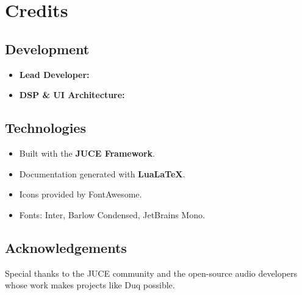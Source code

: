 \chapter{Credits}
\label{ch:credits}

\section{Development}
\begin{itemize}
    \item \textbf{Lead Developer:} \authorname
    \item \textbf{DSP \& UI Architecture:} \authorname
\end{itemize}

\section{Technologies}
\begin{itemize}
    \item Built with the \textbf{JUCE Framework}.
    \item Documentation generated with \textbf{LuaLaTeX}.
    \item Icons provided by FontAwesome.
    \item Fonts: Inter, Barlow Condensed, JetBrains Mono.
\end{itemize}

\section{Acknowledgements}
Special thanks to the JUCE community and the open-source audio developers whose work makes projects like Duq possible.
